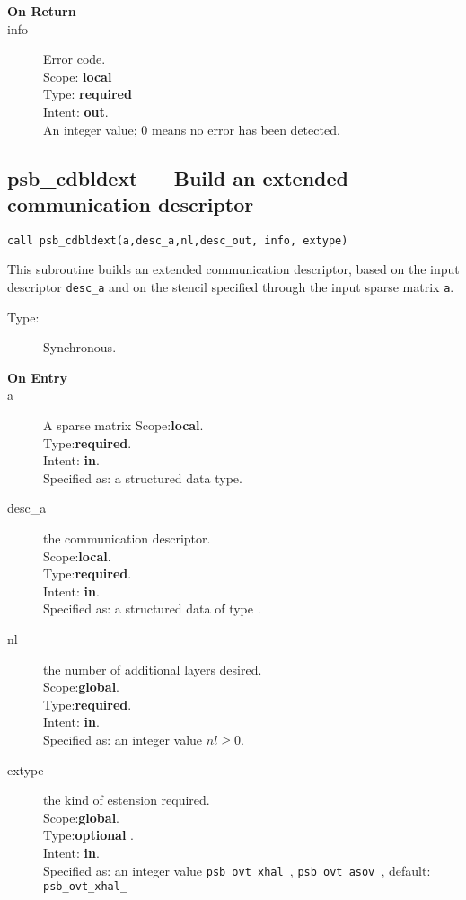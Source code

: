 \begin{description}
\item[\bf On Return]
\item[info] Error code.\\
Scope: {\bf local} \\
Type: {\bf required} \\
Intent: {\bf out}.\\
An integer value; 0 means no error has been detected. 
\end{description}



%
%
\clearpage\subsection{psb\_cdbldext --- Build an extended  communication
  descriptor}

\begin{verbatim}
call psb_cdbldext(a,desc_a,nl,desc_out, info, extype)
\end{verbatim}

This subroutine builds an extended communication descriptor, based on
the input descriptor \verb|desc_a| and on the stencil specified
through the input sparse matrix \verb|a|. 
\begin{description}
\item[Type:] Synchronous.
\item[\bf On Entry]
\item[a] A sparse matrix
Scope:{\bf local}.\\
Type:{\bf required}.\\
Intent: {\bf in}.\\
Specified as: a structured data type.
\item[desc\_a] the communication descriptor.\\
Scope:{\bf local}.\\
Type:{\bf required}.\\
Intent: {\bf in}.\\
Specified as: a structured data of type \spdata.
\item[nl] the number of additional layers desired.\\
Scope:{\bf global}.\\
Type:{\bf required}.\\
Intent: {\bf in}.\\
Specified as: an integer value $nl\ge 0$. 
\item[extype] the kind of estension required.\\
Scope:{\bf global}.\\
Type:{\bf optional }.\\
Intent: {\bf in}.\\
Specified as: an integer value
\verb|psb_ovt_xhal_|, \verb|psb_ovt_asov_|, default: \verb|psb_ovt_xhal_|

\end{description}

